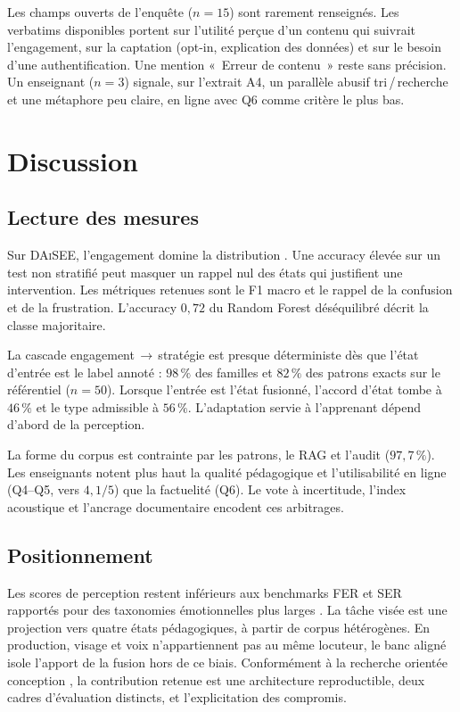 Les champs ouverts de l'enquête ($n=15$) sont rarement renseignés.
Les verbatims disponibles portent sur l'utilité perçue d'un contenu
qui suivrait l'engagement, sur la captation (opt-in, explication des
données) et sur le besoin d'une authentification. Une mention
«~Erreur de contenu~» reste sans précision. Un enseignant ($n=3$)
signale, sur l'extrait A4, un parallèle abusif tri\,/\,recherche et une
métaphore peu claire, en ligne avec Q6 comme critère le plus bas.

\section{Discussion}
\label{sec:val-discussion}

\subsection{Lecture des mesures}

Sur \textsc{DAiSEE}, l'engagement domine la distribution
\cite{gupta2016daisee}. Une accuracy élevée sur un test non stratifié
peut masquer un rappel nul des états qui justifient une intervention.
Les métriques retenues sont le F1 macro et le rappel de la confusion et
de la frustration. L'accuracy $0{,}72$ du Random Forest déséquilibré
décrit la classe majoritaire.

La cascade engagement\,$\rightarrow$\,stratégie est presque
déterministe dès que l'état d'entrée est le label annoté : $98\,\%$ des
familles et $82\,\%$ des patrons exacts sur le référentiel ($n=50$).
Lorsque l'entrée est l'état fusionné, l'accord d'état tombe à $46\,\%$
et le type admissible à $56\,\%$. L'adaptation servie à l'apprenant
dépend d'abord de la perception.

La forme du corpus est contrainte par les patrons, le RAG et l'audit
($97{,}7\,\%$). Les enseignants notent plus haut la qualité pédagogique
et l'utilisabilité en ligne (Q4--Q5, vers $4{,}1/5$) que la factuelité
(Q6). Le vote à incertitude, l'index acoustique et l'ancrage
documentaire encodent ces arbitrages.

\subsection{Positionnement}

Les scores de perception restent inférieurs aux benchmarks FER et SER
rapportés pour des taxonomies émotionnelles plus larges
\cite{busso2008iemocap,chen2022wavlm}. La tâche visée est une projection
vers quatre états pédagogiques, à partir de corpus hétérogènes. En
production, visage et voix n'appartiennent pas au même locuteur, le
banc aligné isole l'apport de la fusion hors de ce biais. Conformément
à la recherche orientée conception \cite{hevner2004design}, la
contribution retenue est une architecture reproductible, deux cadres
d'évaluation distincts, et l'explicitation des compromis.


